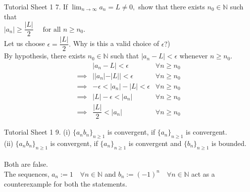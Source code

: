 \documentclass[aspectratio=169]{beamer}
\begin{document}
\begin{frame}{Tutorial Sheet 1}
    7. If $\displaystyle\lim_{n\to \infty}a_n = L \neq 0,$ show that there exists $n_0 \in \mathbb{N}$ such that \\
    \hspace{10em} $|a_n| \ge \dfrac{|L|}{2} \quad \text{ for all } n \ge n_0.$ \\
    Let us choose $\epsilon = \dfrac{|L|}{2}.$ Why is this a valid choice of $\epsilon?$) \\
    By hypothesis, there exists $n_0 \in \mathbb{N}$ such that $|a_n - L| < \epsilon$ whenever $n \ge n_0.$
    \begin{align*}
        &|a_n - L| < \epsilon & \forall n \ge n_0 \\
        \implies& ||a_n| - |L|| < \epsilon & \forall n \ge n_0 \\
        \implies& -\epsilon < |a_n| - |L| < \epsilon & \forall n \ge n_0 \\
        \implies& |L| - \epsilon < |a_n|  & \forall n \ge n_0 \\
        \implies& \dfrac{|L|}{2} < |a_n|  & \forall n \ge n_0
    \end{align*}
\end{frame}

\begin{frame}{Tutorial Sheet 1}
    9. (i) $\{a_nb_n\}_{n\ge1}$ is convergent, if $\{a_n\}_{n\ge1}$ is convergent.\\
    \phantom{9.} (ii) $\{a_nb_n\}_{n\ge1}$ is convergent, if $\{a_n\}_{n\ge1}$ is convergent and $\{b_n\}_{n\ge1}$ is bounded.\\~\\
    Both are {\color[rgb]{1, 0, 0} false.}\\
    The sequences, $a_n := 1\quad \forall n \in \mathbb{N}$ and $b_n := (-1)^n \quad \forall n \in \mathbb{N}$ act as a counterexample for both the statements.
\end{frame}
\end{document}
